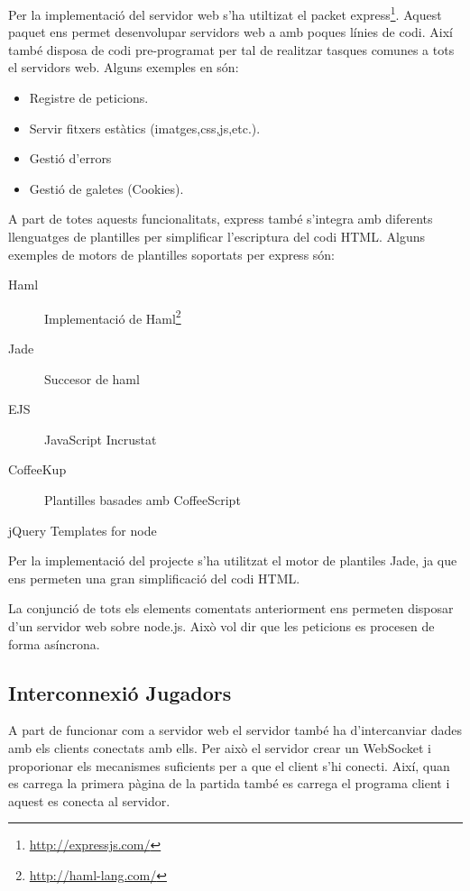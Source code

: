 Per la implementació del servidor web s'ha utiltizat el packet express\footnote{\url{http://expressjs.com/}}. Aquest paquet ens permet desenvolupar servidors web a amb poques línies de codi. Així també disposa de codi pre-programat per tal de realitzar tasques comunes a tots el servidors web. Alguns exemples en són:

\begin{itemize}
\item{Registre de peticions.}
\item{Servir fitxers estàtics (imatges,css,js,etc.).}
\item{Gestió d'errors}
\item{Gestió de galetes (Cookies).}
\end{itemize}

A part de totes aquests funcionalitats, express també s'integra amb diferents llenguatges de plantilles per simplificar l'escriptura del codi HTML. Alguns exemples de motors de plantilles soportats per express són: 

\begin{description}
\item[Haml] {Implementació de Haml\footnote{\url{http://haml-lang.com/}} }
\item[Jade] {Succesor de haml}
\item[EJS] {JavaScript Incrustat}
\item[CoffeeKup] {Plantilles basades amb CoffeeScript}
\item[jQuery Templates for node]
\end{description}

Per la implementació del projecte s'ha utilitzat el motor de plantiles Jade, ja que ens permeten una gran simplificació del codi HTML.

La conjunció de tots els elements comentats anteriorment ens permeten disposar d'un servidor web sobre node.js. Això vol dir que les peticions es procesen de forma asíncrona. 

\subsection{Interconnexió Jugadors}

A part de funcionar com a servidor web el servidor també ha d'intercanviar dades amb els clients conectats amb ells. Per això el servidor crear un WebSocket i proporionar els mecanismes suficients per a que el client s'hi conecti. Així, quan es carrega la primera pàgina de la partida també es carrega el programa client i aquest es conecta al servidor. 

